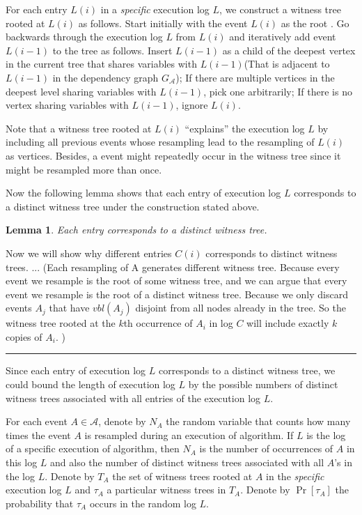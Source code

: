 \documentclass[twoside]{article}
\newtheorem{lemma}[theorem]{Lemma}
\newenvironment{proof}{{\it Proof.}}{\hfill\rule{2mm}{2mm}}
\begin{document}
For each entry $L(i)$ in a \textit{specific} execution log $L$, we construct a witness tree rooted at $L(i)$ as follows. Start initially with the event $L(i)$ as the root . Go backwards through the execution log $L$ from $L(i)$ and iteratively add event $L(i-1)$ to the tree as follows. Insert $L(i-1)$ as a child of the deepest vertex in the current tree that shares variables with $L(i-1)$(That is adjacent to $L(i-1)$ in the dependency graph $G_{\mathcal{A}}$); If there are multiple vertices in the deepest level sharing variables with $L(i-1)$, pick one arbitrarily; If there is no vertex sharing variables with $L(i-1)$, ignore $L(i)$.

Note that a witness tree rooted at $L(i)$ ``explains'' the execution log $L$ by including all previous events  whose resampling lead to the resampling of $L(i)$ as vertices. Besides, a event might repeatedly occur in the witness tree since it might be resampled more than once.

Now the following lemma shows that each entry of execution log $L$ corresponds to a distinct witness tree under the construction stated above.

\begin{lemma}
Each entry corresponds to a distinct witness tree.
\end{lemma}
\begin{proof}
Now we will show why different entries $C(i)$ corresponds to distinct witness trees. ...
(Each resampling of A generates different witness tree.
Because every event we resample is the root of some witness tree, and we can argue that every event we resample is the root of a distinct witness tree. Because we only discard events $A_j$ that have $vbl(A_j) $ disjoint from all nodes already in the tree. So the witness tree rooted at the $k$th occurrence of $A_i$ in log $C$ will include exactly $k$ copies of $A_i$. )
\end{proof}

Since each entry of execution log $L$ corresponds to a distinct witness tree, we could bound the length of execution log $L$ by the possible numbers of distinct witness trees associated with all entries of the execution log $L$.

For each event $A\in\mathcal{A}$, denote by $N_{A}$ the random variable that counts how many times the event $A$ is resampled during an execution of algorithm. If $L$ is the log of a specific execution of algorithm, then $N_A$ is the number of occurrences of $A$ in this log $L$ and also the number of distinct witness trees associated with all $A$'s in the log $L$. Denote by $T_A$ the set of witness trees rooted at $A$ in the \textit{specific} execution log $L$ and $\tau_A$ a particular witness trees in $T_A$. Denote by $\Pr[\tau_A]$ the probability that $\tau_A$ occurs in the random log $L$.
\end{document}
